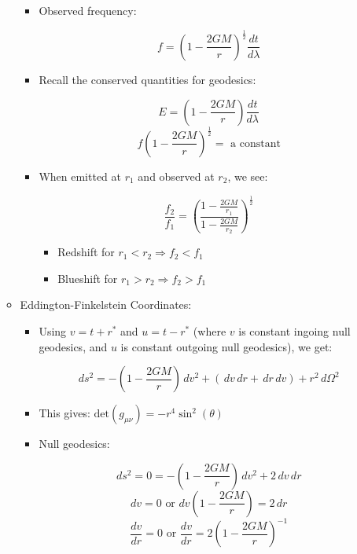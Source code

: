 \begin{itemize}
\begin{itemize}
\begin{itemize}
          \item Observed frequency:

            $$f=\left( 1-\frac{2GM}{r} \right)^{\frac{1}{2}}\frac{dt}{d\lambda}$$

          \item Recall the conserved quantities for geodesics:

            $$E=\left( 1-\frac{2GM}{r} \right)\frac{dt}{d\lambda}$$
            $$f\left( 1-\frac{2GM}{r} \right)^{\frac{1}{2}}=\text{ a constant}$$

          \item When emitted at $r_1$ and observed at $r_2$, we see:

            $$\frac{f_2}{f_1}=\left( \frac{1-\frac{2GM}{r_1}}{1-\frac{2GM}{r_2}} \right)^{\frac{1}{2}}$$

              \begin{itemize}

                \item Redshift for $r_1<r_2\Rightarrow f_2<f_1$

                \item Blueshift for $r_1>r_2\Rightarrow f_2>f_1$

              \end{itemize}

        \end{itemize}

      \item Eddington-Finkelstein Coordinates:

        \begin{itemize}

          \item Using $v=t+r^*$ and $u=t-r^*$ (where $v$ is constant ingoing null geodesics, and $u$ is constant outgoing null geodesics), we get:

            $$ds^2=-\left( 1-\frac{2GM}{r} \right)\,dv^2+(\,dv\,dr+\,dr\,dv)+r^2\,d\Omega^2$$

          \item This gives: $\text{det}(g_{\mu\nu})=-r^4\sin^2(\theta)$

          \item Null geodesics:

            $$ds^2=0=-\left( 1-\frac{2GM}{r} \right)\,dv^2+2\,dv\,dr$$
            $$dv=0\text{ or } dv\left( 1-\frac{2GM}{r} \right)=2\,dr$$
            $$\frac{dv}{dr}=0\text{ or } \frac{dv}{dr}=2\left( 1-\frac{2GM}{r} \right)^{-1}$$


\end{itemize}
\end{itemize}
\end{itemize}
